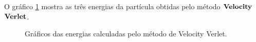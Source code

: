 \documentclass[a4wide]{report}
\begin{document}
O gráfico \ref{gra8} mostra as três energias da partícula obtidas pelo método $\bf Velocity$ $\bf Verlet$.

\begin{figure}[!ht]
\centering
{}\qquad 
{}\qquad 
{}\qquad 
\caption{Gráficos das energias calculadas pelo método de Velocity Verlet.}
\label{gra8}
\end{figure}
\end{document}
